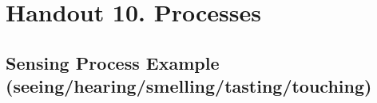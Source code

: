 \documentclass[a4 paper, 12pt]{article}
\begin{document}
\pagestyle{empty}

\makeatletter
{}
\makeatother

\graphicspath{{../}}

\section*{Handout 10. Processes}

\subsection*{Sensing Process Example (seeing/hearing/smelling/tasting/touching)}

\begin{center}

\end{center}

\setlength{\tabcolsep}{0mm}
\renewcommand{\arraystretch}{1.1}
\end{document}
